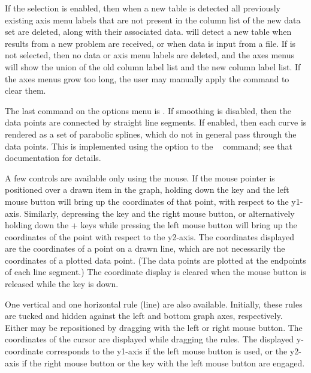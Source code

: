 If the  selection is enabled, then when a
new table is detected all previously existing axis menu labels that are
not present in the column list of the new data set are deleted, along
with their associated data.   will detect a new table when
results from a new problem are received, or when data is input from a
file.  If  is not selected, then no data or
axis menu labels are deleted, and the axes menus will show the union of
the old column label list and the new column label list.  If the axes
menus grow too long, the user may manually apply the
 command to clear them.

The last command on the options menu is .  If
smoothing is disabled, then the data points are connected by straight
line segments.  If enabled, then each curve is rendered as a set of
parabolic splines, which do not in general pass through the data points.
This is implemented using the  option to the
\Tcl\  command; see that documentation for
details.

A few controls are available only using the mouse.  If the mouse pointer
is positioned over a drawn item in the graph, holding down the
 key and the left mouse button will bring up the
coordinates of that point, with respect to the y1-axis.  Similarly,
depressing the  key and the right mouse button, or
alternatively holding down the + keys while
pressing the left mouse button will bring up the coordinates of the
point with respect to the y2-axis.  The coordinates displayed are the
coordinates of a point on a drawn line, which are not necessarily the
coordinates of a plotted data point.  (The data points are plotted at
the endpoints of each line segment.)  The coordinate display is cleared
when the mouse button is released while the  key is down.

One vertical and one horizontal rule (line) are also available.
Initially, these rules are tucked and hidden against the left and bottom
graph axes, respectively.  Either may be repositioned by dragging with
the left or right mouse button.  The coordinates of the cursor are
displayed while dragging the rules.  The displayed y-coordinate
corresponds to the y1-axis if the left mouse button is used, or the
y2-axis if the right mouse button or the  key with the left
mouse button are engaged.

